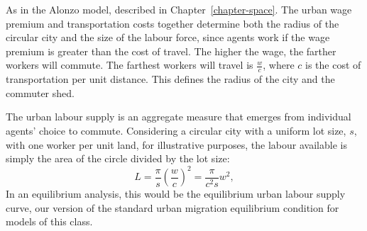 As in the Alonzo model, described in Chapter~\ref{chapter-space}. The {urban wage premium} and transportation costs together determine both the radius of the circular city and the size of the labour force, %
since agents work if the wage premium is greater than the cost of travel. %
The higher the wage, the  farther workers will commute. %
The farthest workers will travel  is $\frac{w}{{c}}$, where ${c}$ is the cost of transportation per unit distance. This defines the radius of the city and the commuter shed.

The \gls{urban labour supply} is an \gls{aggregate} measure that emerges from individual agents' choice to commute. Considering a \gls{circular city} with a uniform lot size, $s$, with one worker per unit land, for illustrative purposes, the labour available is simply the area of the circle divided by the lot size: 
\begin{equation}
 L = \frac{\pi}{s} \left(\frac{w}{{c}}\right)^2
   =\frac{\pi}{{c}^2 s} w^2,
\label{eqn-labour-supply1}
\end{equation}
In an equilibrium analysis, this would be the equilibrium \gls{urban labour supply} curve, our version of the standard urban \gls{migration equilibrium} condition for models of this class. %


